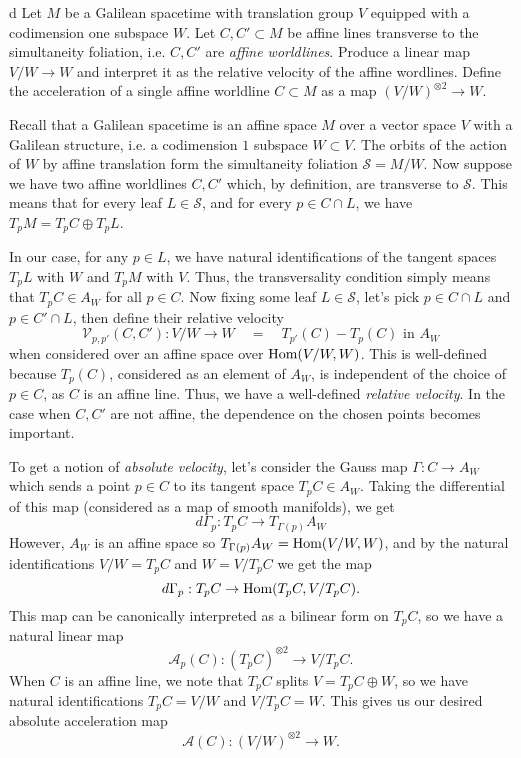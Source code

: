 \documentclass{pset}
\begin{document}
\begin{parts}
  \begin{part}{d}
    Let $M$ be a Galilean spacetime with translation group $V$ equipped with a codimension one subspace $W$. Let $C, C'\subset M$ be affine lines transverse to the simultaneity foliation, i.e. $C,C'$ are \emph{affine worldlines}. Produce a linear map $V/W \to W$ and interpret it as the relative velocity of the affine wordlines. Define the acceleration of a single affine worldline $C\subset M$ as a map $(V/W)^{\otimes 2} \to W$.
  \end{part}

  Recall that a Galilean spacetime is an affine space $M$ over a vector space $V$ with a Galilean structure, i.e. a codimension $1$ subspace $W\subset V$. The orbits of the action of $W$ by affine translation form the simultaneity foliation $\mathcal{S}=M/W$. Now suppose we have two affine worldlines $C, C'$ which, by definition, are transverse to $\mathcal{S}$. This means that for every leaf $L\in \mathcal{S}$, and for every $p\in C\cap L$, we have $T_p M = T_p C\oplus T_p L$.

  In our case, for any $p\in L$, we have natural identifications of the tangent spaces $T_p L$ with $W$ and $T_p M$ with $V$. Thus, the transversality condition simply means that $T_p C \in A_W$ for all $p\in C$. Now fixing some leaf $L\in \mathcal{S}$, let's pick $p\in C\cap L$ and $p\in C'\cap L$, then define their relative velocity 
  \[
    \mathcal{V}_{p,p'}(C,C') : V/W \to W \quad=\quad T_{p'}(C) - T_p(C) \textrm{ in }A_W
  \]
  when considered over an affine space over $\textrm{Hom}(V/W, W)$. This is well-defined because $T_p(C)$, considered as an element of $A_W$, is independent of the choice of $p\in C$, as $C$ is an affine line. Thus, we have a well-defined \emph{relative velocity}. In the case when $C,C'$ are not affine, the dependence on the chosen points becomes important.

  To get a notion of \emph{absolute velocity}, let's consider the Gauss map $\Gamma : C \to A_W$ which sends a point $p\in C$ to its tangent space $T_p C\in A_W$. Taking the differential of this map (considered as a map of smooth manifolds), we get
  \[
    d\Gamma_p : T_p C \to T_{\Gamma(p)} A_W 
  \]
  However, $A_W$ is an affine space so $T_{\Gamma(p)} A_W = \textrm{Hom}(V/W, W)$, and by the natural identifications $V/W=T_pC$ and $W=V/T_p C$ we get the map
  \[
    d\Gamma_p : T_p C \to \textrm{Hom}(T_p C, V/ T_p C).
  \]
  This map can be canonically interpreted as a bilinear form on $T_p C$, so we have a natural linear map
  \[
    \mathcal{A}_p(C) : (T_p C)^{\otimes 2} \to V/T_p C.
  \]
  When $C$ is an affine line, we note that $T_p C$ splits $V=T_p C\oplus W$, so we have natural identifications $T_p C = V/W$ and $V/T_p C=W$. This gives us our desired absolute acceleration map
  \[\mathcal{A}(C) : (V/W)^{\otimes 2} \to W.\]
\end{parts}
\end{document}
